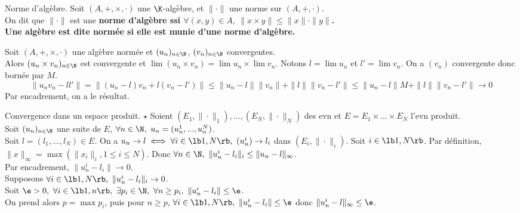 \documentclass[11pt]{article}
\begin{document}
\vspace*{-0.4cm}

\begin{defi}{Norme d'algèbre.}{}
    Soit $(A,+,\times,\cdot)$ une $\K$-algèbre, et $\|\cdot\|$ une norme sur $(A,+,\cdot)$.\\
    On dit que $\|\cdot\|$ est une \bf{norme d'algèbre} ssi $\forall (x,y)\in A, ~ \|x\times y\| \leq \|x\|\cdot\|y\|$.\\
    Une algèbre est dite normée si elle est munie d'une norme d'algèbre.
\end{defi}

\vspace*{-0.7cm}

\begin{prop}{}{}
    Soit $(A,+,\times,\cdot)$ une algèbre normée et $(u_n)_{n\in\N}$, $(v_n)_{n\in\N}$ convergentes.\\
    Alors $(u_n\times v_n)_{n\in\N}$ est convergente et $\lim (u_n\times v_n) = \lim u_n \times \lim v_n$.
    \tcblower
    Notons $l=\lim u_n$ et $l'=\lim v_n$. On a $(v_n)$ convergente donc bornée par $M$.
    \begin{equation*}
        \|u_nv_n - ll'\| = \|(u_n - l)v_n + l(v_n - l')\| \leq \|u_n - l\|\|v_n\| + \|l\|\|v_n - l'\| \leq \|u_n-l\|M + \|l\|\|v_n - l'\| \to 0 
    \end{equation*}
    Par encadrement, on a le résultat.
\end{prop}

\vspace*{-0.7cm}

\begin{prop}{Convergence dans un espace produit. $\star$}{}
    Soient $(E_1,\|\cdot\|_1),...,(E_N,\|\cdot\|_N)$ des evn et $E=E_1\times ... \times E_N$ l'evn produit.\\
    Soit $(u_n)_{n\in\N}$ une suite de $E$, $\forall n \in \N, ~ u_n = (u_n^1, ..., u_n^N)$.\\
    Soit $l=(l_1,...,l_N)\in E$. On a $u_n \to l \iff \forall i \in \lb1,N\rb, ~ (u_n^i)\to l_i$ dans $(E_i,\|\cdot\|_i)$.
    \tcblower
    \boxed{\ra} Soit $i\in\lb1,N\rb$. Par définition, $\|x\|_{\infty}=\max(\|x_i\|_i, 1 \leq i \leq N)$. Donc $\forall n \in \N, ~ \|u_n^i-l_i\|_i\leq \|u_n-l\|_{\infty}$.\\
    Par encadrement, $\|u_n^i-l_i\|\to0$.\\
    \boxed{\la} Supposons $\forall i \in \lb 1, N \rb, ~ \|u_n^i-l_i\|_i\to0$.\\
    Soit $\e>0, ~ \forall i \in \lb1,n\rb, ~ \exists p_i \in \N, ~ \forall n \geq p_i, ~ \|u_n^i - l_i\| \leq \e$.\\
    On prend alors $p=\max p_i$, puis pour $n\geq p$,  $\forall i \in \lb1,N\rb, ~ \|u_n^i-l_i\|\leq \e$ donc $\|u_n^i-l\|_{\infty}\leq\e$. 
\end{prop}
\end{document}
